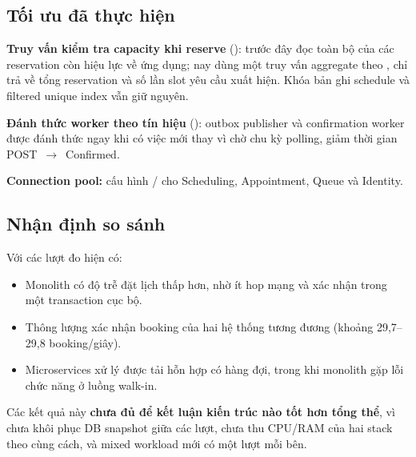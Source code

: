 \subsection{Tối ưu đã thực hiện}
\label{sec:optim}

\begin{codeitems}
  \item \textbf{Truy vấn kiểm tra capacity khi reserve} (): trước đây đọc toàn bộ  của các reservation còn hiệu lực về ứng dụng; nay dùng một truy vấn aggregate theo , chỉ trả về tổng reservation và số lần slot yêu cầu xuất hiện. Khóa bản ghi schedule và filtered unique index vẫn giữ nguyên.
  \item \textbf{Đánh thức worker theo tín hiệu} (): outbox publisher và confirmation worker được đánh thức ngay khi có việc mới thay vì chờ chu kỳ polling, giảm thời gian POST~$\rightarrow$~Confirmed.
  \item \textbf{Connection pool:} cấu hình / cho Scheduling, Appointment, Queue và Identity.
\end{codeitems}

\subsection{Nhận định so sánh}

Với các lượt đo hiện có:
\begin{itemize}
  \item Monolith có độ trễ đặt lịch thấp hơn, nhờ ít hop mạng và xác nhận trong một transaction cục bộ.
  \item Thông lượng xác nhận booking của hai hệ thống tương đương (khoảng 29,7--29,8 booking/giây).
  \item Microservices xử lý được tải hỗn hợp có hàng đợi, trong khi monolith gặp lỗi chức năng ở luồng walk-in.
\end{itemize}

Các kết quả này \textbf{chưa đủ để kết luận kiến trúc nào tốt hơn tổng thể}, vì chưa khôi phục DB snapshot giữa các lượt, chưa thu CPU/RAM của hai stack theo cùng cách, và mixed workload mới có một lượt mỗi bên.
